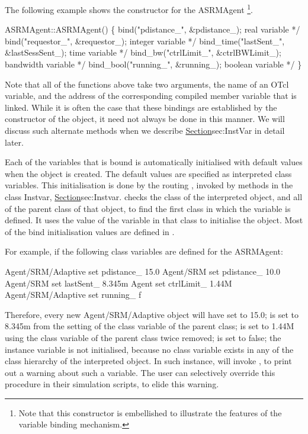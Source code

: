 The following example shows the constructor for the ASRMAgent%
\footnote{Note that this constructor is embellished to illustrate
        the features of the variable binding mechanism.}.
\begin{program}
        ASRMAgent::ASRMAgent() \{
                bind("pdistance_", &pdistance_);      \* real variable */
                bind("requestor_", &requestor_);      \* integer variable */
                bind_time("lastSent_", &lastSessSent_); \* time variable */
                bind_bw("ctrlLimit_", &ctrlBWLimit_); \* bandwidth variable */
                bind_bool("running_", &running_);     \* boolean variable */
        \}
\end{program}
Note that all of the functions above take two arguments,
the name of an OTcl variable,
and the address of the corresponding compiled member variable
that is linked.
While it is often the case that these bindings are established
by the constructor of the object, 
it need not always be done in this manner.
We will discuss such alternate methods
when we describe \href{the class InstVar}{Section}{sec:InstVar}
in detail later.

Each of the variables that is bound is automatically initialised
with default values when the object is created.
The default values are specified as interpreted class variables.
This initialisation is done by the routing ,
invoked by methods in the class Instvar,
\href{described later}{Section}{sec:Instvar}.
 checks the class of the interpreted object,
and all of the parent class of that object, to find the first
class in which the variable is defined.
It uses the value of the variable in that class to initialise the object.
Most of the bind initialisation values are defined in
.

For example, if the following class variables are defined for the ASRMAgent:
\begin{program}
        Agent/SRM/Adaptive set pdistance_ 15.0
        Agent/SRM set pdistance_ 10.0
        Agent/SRM set lastSent_ 8.345m
        Agent set ctrlLimit_    1.44M
        Agent/SRM/Adaptive set running_ f
\end{program}
Therefore, every new Agent/SRM/Adaptive object will have
 set to 15.0;
 is set to 8.345m
from the setting of the class variable of the parent class;
 is set to 1.44M
using the class variable of the parent class twice removed;
 is set to false;
the instance variable  is not initialised,
because no class variable
exists in any of the class hierarchy of the interpreted object.
In such instance,  will invoke 
, to print out a warning about such a variable.
The user can selectively override this procedure
in their simulation scripts, to elide this warning.

